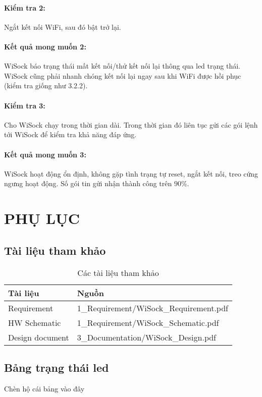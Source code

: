 \documentclass[a4paper]{article}
\let\oldsection\section
\renewcommand\section{\clearpage\oldsection}
\begin{document}
\paragraph*{Kiểm tra 2:} Ngắt kết nối WiFi, sau đó bật trở lại.
\paragraph*{Kết quả mong muốn 2:} WiSock báo trạng thái mất kết nối/thử kết nối lại thông qua led trạng thái. WiSock cũng phải nhanh chóng kết nối lại ngay sau khi WiFi được hồi phục (kiểm tra giống như 3.2.2).\\
\paragraph*{Kiểm tra 3:} Cho WiSock chạy trong thời gian dài. Trong thời gian đó liên tục gửi các gói lệnh tới WiSock để kiểm tra khả năng đáp ứng.
\paragraph*{Kết quả mong muốn 3:} WiSock hoạt động ổn định, không gặp tình trạng tự reset, ngắt kết nối, treo cứng ngưng hoạt động. Số gói tin gửi nhận thành công trên $90\%$.

\section{PHỤ LỤC}
\subsection{Tài liệu tham khảo}
\begin{table}[!h]
\centering
\label{my-label}
\begin{tabular}{|l|l|}
\hline
\textbf{Tài liệu} & \textbf{Nguồn}                         \\ \hline
Requirement       & 1\_Requirement/WiSock\_Requirement.pdf \\ \hline
HW Schematic      & 1\_Requirement/WiSock\_Schematic.pdf   \\ \hline
Design document   & 3\_Documentation/WiSock\_Design.pdf    \\ \hline
\end{tabular}
\caption{Các tài liệu tham khảo}
\end{table}
\subsection{Bảng trạng thái led}
Chèn hộ cái bảng vào đây
\end{document}
